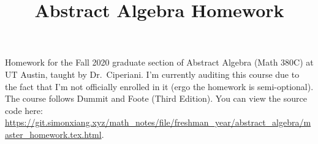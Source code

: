 \documentclass{scrartcl}
\title{Abstract Algebra Homework}
\date{}
\begin{document}
\maketitle
Homework for the Fall 2020 graduate section of Abstract Algebra (Math 380C) at UT Austin, taught by Dr.\ Ciperiani. I'm currently auditing this course due to the fact that I'm not officially enrolled in it (ergo the homework is semi-optional). The course follows Dummit and Foote (Third Edition). You can view the source code here: \url{https://git.simonxiang.xyz/math_notes/file/freshman_year/abstract_algebra/master_homework.tex.html}.
\tableofcontents
    
\end{document}
